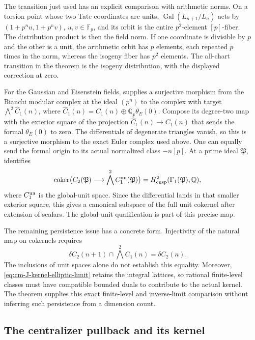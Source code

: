 \documentclass[11pt]{article}
\theoremstyle{definition}\newtheorem{definition}[theorem]{Definition}
\begin{document}
The transition just used has an explicit comparison
with arithmetic norms.  On a torsion point whose two
Tate coordinates are units,
\(\operatorname{Gal}(L_{n+1}/L_n)\) acts by
\((1+p^nu,1+p^nv)\), \(u,v\in\mathbb F_p\), and
its orbit is the entire \(p^2\)-element \([p]\)-fiber.
The distribution product is then the field norm.
If one coordinate is divisible by \(p\) and the other
is a unit, the arithmetic orbit has \(p\) elements,
each repeated \(p\) times in the norm, whereas the
isogeny fiber has \(p^2\) elements.  The all-chart
transition in the theorem is the isogeny distribution,
with the displayed correction at zero.

For the Gaussian and Eisenstein fields,
\cite[Theorem 5.16, p.~34]{GoncharovEuler} supplies a
surjective morphism from the Bianchi modular complex
at the ideal \((p^n)\) to the complex with target
\(\bigwedge^2\widehat C_1(n)\), where
\(\widehat C_1(n)=C_1(n)\oplus\mathbb Q_p\theta_E(0)\).
Compose its degree-two map with the exterior square
of the projection \(\widehat C_1(n)\to C_1(n)\)
that sends the formal \(\theta_E(0)\) to zero.
The differentials of degenerate triangles vanish,
so this is a surjective morphism to the exact Euler
complex used above.  One can equally send the formal
origin to its actual normalized class \(-n[p]\).
At a prime ideal \(\mathfrak P\),
\cite[Theorem 1.2, p.~9]{GoncharovEuler} identifies
\[
 \operatorname{coker}\bigl(C_2(\mathfrak P)
       \longrightarrow\bigwedge^2C_1^{\rm un}(\mathfrak P)\bigr)
       =H^2_{\rm cusp}(\Gamma_1(\mathfrak P),\mathbb Q),
\]
where \(C_1^{\rm un}\) is the global-unit space.
Since the differential lands in that smaller exterior
square, this gives a canonical subspace of the full
unit cokernel after extension of scalars.  The
global-unit qualification is part of this precise map.

The remaining persistence issue has a concrete form.
Injectivity of the natural map on cokernels requires
\[
 \delta C_2(n+1)\cap\bigwedge^2C_1(n)=\delta C_2(n).
\]
The inclusions of unit spaces alone do not establish
this equality.  Moreover,
\eqref{eq:cm-J-kernel-elliptic-limit} retains the
integral lattices, so rational finite-level classes
must have compatible bounded duals to contribute to
the actual kernel.  The theorem supplies this exact
finite-level and inverse-limit comparison without
inferring such persistence from a dimension count.

\subsection{The centralizer pullback and its kernel}
\label{subsec:cm-actual-centralizer}
\end{document}

